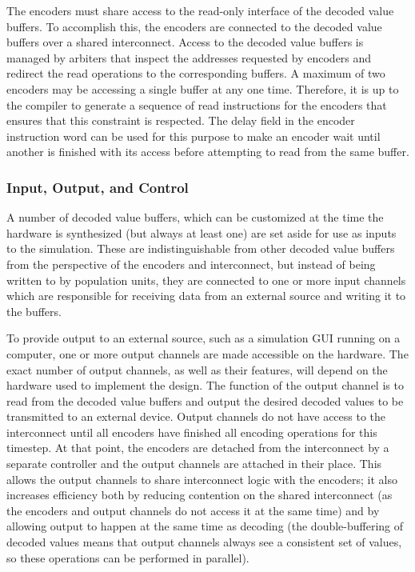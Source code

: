 \documentclass[english]{article}
\begin{document}
The encoders must share access to the read-only interface of the decoded value buffers. To accomplish this,
the encoders are connected to the decoded value buffers over a shared interconnect. Access to the decoded value buffers
is managed by arbiters that inspect the addresses requested by encoders and redirect the read operations to the
corresponding buffers. A maximum of two encoders may be accessing a single buffer at any one time.
Therefore, it is up to the compiler to generate a sequence of read instructions for the encoders that ensures that this
constraint is respected. The delay field in the encoder instruction word can be used for this purpose to make an encoder
wait until another is finished with its access before attempting to read from the same buffer.

\subsubsection{Input, Output, and Control}

A number of decoded value buffers, which can be customized at the time the hardware is synthesized
(but always at least one)
are set aside for use as inputs to the simulation. These are indistinguishable from other decoded value buffers
from the perspective of the encoders and interconnect, but instead of being written to by population units,
they are connected to one or more input channels which are responsible for receiving data from an external source
and writing it to the buffers.


To provide output to an external source, such as a simulation GUI running on a computer, one or more output channels
are made accessible on the hardware. The exact number of output channels, as well as their features, will depend on the hardware used to implement the design.
The function of the output channel is to read from the decoded value buffers and output the desired decoded values to be transmitted
to an external device. Output channels do not have access to the interconnect until all encoders have finished all
encoding operations for this timestep. At that point, the encoders are detached from the interconnect by a separate controller and the output
channels are attached in their place. This allows the output channels to share interconnect logic with the encoders;
it also increases efficiency both by reducing contention on the shared interconnect (as the encoders and output channels
do not access it at the same time) and by allowing output to happen at the same time as decoding
(the double-buffering of decoded values means that output channels always see a consistent set of values,
so these operations can be performed in parallel).
\end{document}
